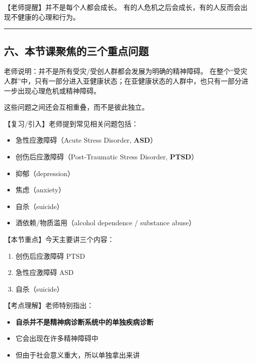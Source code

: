 \documentclass[
  chinese,
  9pt,
  a4paper,
]{ctexart}
\providecommand{\tightlist}{%
  \setlength{\itemsep}{0pt}\setlength{\parskip}{0pt}}
\begin{document}
【老师提醒】并不是每个人都会成长。
有的人危机之后会成长，有的人反而会出现不健康的心理和行为。

\begin{center}\rule{0.5\linewidth}{0.5pt}\end{center}

\subsection{六、本节课聚焦的三个重点问题}\label{ux516dux672cux8282ux8bfeux805aux7126ux7684ux4e09ux4e2aux91cdux70b9ux95eeux9898}

老师说明：并不是所有受灾/受创人群都会发展为明确的精神障碍。
在整个``受灾人群''中，只有一部分进入亚健康状态；在亚健康状态的人群中，也只有一部分进一步出现心理危机或精神障碍。

这些问题之间还会互相重叠，而不是彼此独立。

【复习/引入】老师提到常见相关问题包括：

\begin{itemize}
\tightlist
\item
  急性应激障碍（Acute Stress Disorder, \textbf{ASD}）
\item
  创伤后应激障碍（Post-Traumatic Stress Disorder, \textbf{PTSD}）
\item
  抑郁（depression）
\item
  焦虑（anxiety）
\item
  自杀（suicide）
\item
  酒依赖/物质滥用（alcohol dependence / substance abuse）
\end{itemize}

【本节重点】今天主要讲三个内容：

\begin{enumerate}
\def\labelenumi{\arabic{enumi}.}
\tightlist
\item
  创伤后应激障碍 PTSD
\item
  急性应激障碍 ASD
\item
  自杀（suicide）
\end{enumerate}

【考点理解】老师特别指出：

\begin{itemize}
\tightlist
\item
  \textbf{自杀并不是精神病诊断系统中的单独疾病诊断}
\item
  它会出现在许多精神障碍中
\item
  但由于社会意义重大，所以单独拿出来讲
\end{itemize}
\end{document}
